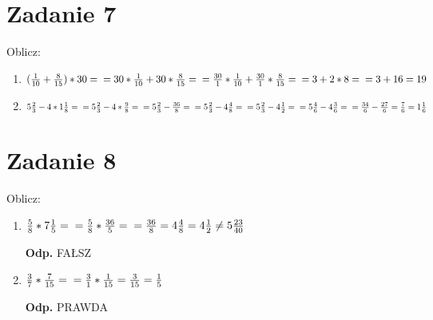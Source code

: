 \documentclass[letterpaper,12pt]{article}
\begin{document}
    \section{Zadanie 7}
    Oblicz:
    \begin{enumerate}[label=\alph*)]
    	\item $ (\frac{1}{10} + \frac{8}{15}) * 30 = \\=%
    		30*\frac{1}{10} + 30*\frac{8}{15} = \\=%
    		\frac{30}{1}*\frac{1}{10} + \frac{30}{1}*\frac{8}{15} = \\=%
    		3 + 2*8 =\\= 3 + 16 = 19 $
    	\item $ 5\frac{2}{3} - 4*1\frac{1}{8} =\\=%
    		5\frac{2}{3} - 4*\frac{9}{8} =\\=%
    		5\frac{2}{3} - \frac{36}{8} =\\=%
    		5\frac{2}{3} - 4\frac{4}{8} =\\=%
    		5\frac{2}{3} - 4\frac{1}{2} =\\=%
    		5\frac{4}{6} - 4\frac{3}{6} =\\=%
    		\frac{34}{6} - \frac{27}{6} = \frac{7}{6} = 1\frac{1}{6} $
    \end{enumerate}
    \section{Zadanie 8}
    Oblicz:
    \begin{enumerate}[label=\alph*)]
    	\item $\frac{5}{8} * 7\frac{1}{5} =\\=
    		\frac{5}{8} * \frac{36}{5} =\\=
    		\frac{36}{8} = 4\frac{4}{8} = 4\frac{1}{2} \neq 5\frac{23}{40} $
    		
    		\textbf{Odp.} FAŁSZ
    	\item $\frac{3}{7} * \frac{7}{15} =\\= 
    		\frac{3}{1} * \frac{1}{15} = \frac{3}{15} = \frac{1}{5} $
    		
    		\textbf{Odp.} PRAWDA
    \end{enumerate}
\end{document}
